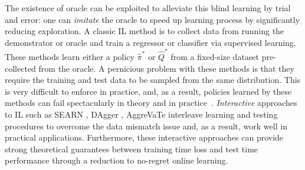 \documentclass{article}
\newcommand{\arun}[1]{\textcolor{red}{\bf Arun: {#1}}}
\begin{document}

The existence of oracle can be exploited to alleviate this blind learning by trial and error: one can \emph{imitate} the oracle to speed up learning process by significantly reducing exploration. A classic IL method is to collect data from running the demonstrator or oracle and train a regressor or classifier via supervised learning. These methods \cite{abbeel2004apprenticeship,syed2008apprenticeship,ratliff2006maximum,ziebart2008maximum,finn2016guided,ho2016generative} learn either a policy $\hat \pi^*$ or $\hat Q^*$ from a fixed-size dataset pre-collected from the oracle. A pernicious problem with these  methods is that they require the training and test data to be sampled from the same distribution.  This is very difficult to enforce in practice, and, as a result, policies learned by these methods can fail spectacularly in theory and in practice~\cite{ross2010efficient}. \emph{Interactive} approaches to IL such as SEARN \cite{daume2009search}, DAgger \cite{Ross2011_AISTATS}, AggreVaTe \cite{ross2014reinforcement} interleave learning and testing procedures to overcome the data mismatch issue and, as a result, work well in practical applications. Furthermore, these interactive approaches can provide strong theoretical guarantees between training time loss and test time performance through a reduction to no-regret online learning.


\end{document}
